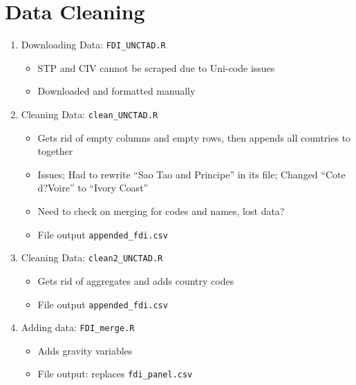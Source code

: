 \documentclass{article}
\begin{document}
\section{Data Cleaning}
\begin{enumerate}
	\item Downloading Data: \texttt{FDI\_UNCTAD.R}
		\begin{itemize}
			\item{STP and CIV cannot be scraped due to Uni-code issues}
			\item{Downloaded and formatted manually}
		\end{itemize}
	\item Cleaning Data: \texttt{clean\_UNCTAD.R}
		\begin{itemize}
			\item{Gets rid of empty columns and empty rows, then appends all countries to together}
			\item{Issues; Had to rewrite ``Sao Tao and Principe'' in its file; Changed ``Cote d?Voire'' to ``Ivory Coast''}
			\item{Need to check on merging for codes and names, lost data?}
			\item File output \texttt{appended\_fdi.csv}
		\end{itemize}
	\item Cleaning Data: \texttt{clean2\_UNCTAD.R}
		\begin{itemize}
			\item{Gets rid of aggregates and adds country codes}
			\item File output \texttt{appended\_fdi.csv}
		\end{itemize}
	\item Adding data: \texttt{FDI\_merge.R}
		\begin{itemize}
			\item{Adds gravity variables}
			\item File output: replaces \texttt{fdi\_panel.csv} 
		\end{itemize}
		
\end{enumerate}
\end{document}
